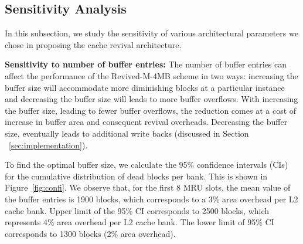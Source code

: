 




\subsection{Sensitivity Analysis}
In this subsection, we study the sensitivity of various architectural parameters we chose in proposing the cache revival architecture.

\noindent\textbf{Sensitivity to number of buffer entries:}
The number of buffer entries can affect the performance of the Revived-M-4MB scheme in two ways: increasing the
buffer size will accommodate more diminishing blocks at a particular instance and decreasing the buffer size will
leads to more buffer overflows. With increasing the buffer size, leading to fewer buffer overflows,
the reduction comes at a cost of increase in buffer area and consequent revival overheads. Decreasing the buffer size, eventually
leads to additional write backs (discussed in Section ~\ref{sec:implementation}).

\begin{figure*} [t]
\centering
 \caption{\label{fig:confi} \scriptsize \bf 95\% Confidence Intervals of Diminished Blocks for each Way}
\end{figure*}

To find the optimal buffer size, we calculate the 95\% confidence intervals (CIs) for the cumulative distribution of
dead blocks per bank. This is shown in Figure~\ref{fig:confi}. We observe that, for the first 8 MRU slots, the
mean value of the buffer entries is 1900 blocks, which corresponds to a 3\% area overhead per L2 cache bank.
Upper limit of the 95\% CI corresponds to 2500 blocks,  which represents 4\% area overhead per L2 cache bank.
The lower limit of 95\% CI corresponds to 1300 blocks (2\% area overhead).

